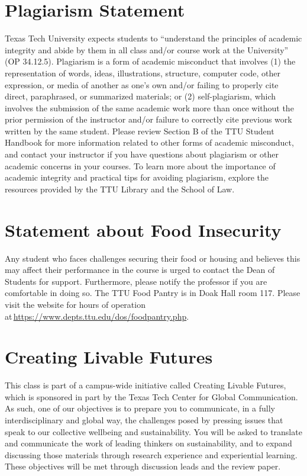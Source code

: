 \documentclass[12pt, notitlepage]{article}   	%
\begin{document}
{\section{Plagiarism Statement}
Texas Tech University expects students to “understand the principles of academic integrity 
and abide by them in all class and/or course work at the University” (OP 34.12.5). 
Plagiarism is a form of academic misconduct that involves (1) the representation of words, 
ideas, illustrations, structure, computer code, other expression, or media of another as 
one's own and/or failing to properly cite direct, paraphrased, or summarized materials; 
or (2) self-plagiarism, which involves the submission of the same academic work more than 
once without the prior permission of the instructor and/or failure to correctly cite 
previous work written by the same student. Please review Section B of the TTU 
Student Handbook for more information related to other forms of academic misconduct, 
and contact your instructor if you have questions about plagiarism or other 
academic concerns in your courses. To learn more about the importance of 
academic integrity and practical tips for avoiding plagiarism, explore the 
resources provided by the TTU Library and the School of Law.

\section{Statement about Food Insecurity}
Any student who faces challenges securing their food or housing
and believes this may affect their performance in the course is
urged to contact the Dean of Students for support. Furthermore,
please notify the professor if you are comfortable in doing so. The
TTU Food Pantry is in Doak Hall room 117. Please visit the
website for hours of operation at \url{https://www.depts.ttu.edu/dos/foodpantry.php}.

\section{Creating Livable Futures}
This class is part of a campus-wide initiative called Creating Livable Futures, 
which is sponsored in part by the Texas Tech Center for Global Communication. 
As such, one of our objectives is to prepare you to communicate, 
in a fully interdisciplinary and global way, the challenges posed by pressing issues 
that speak to our collective wellbeing and sustainability. You will be asked to translate 
and communicate the work of leading thinkers on sustainability, and to expand discussing 
those materials through research experience and experiential learning.
These objectives will be met through discussion leads and the review paper. 

}
\end{document}
